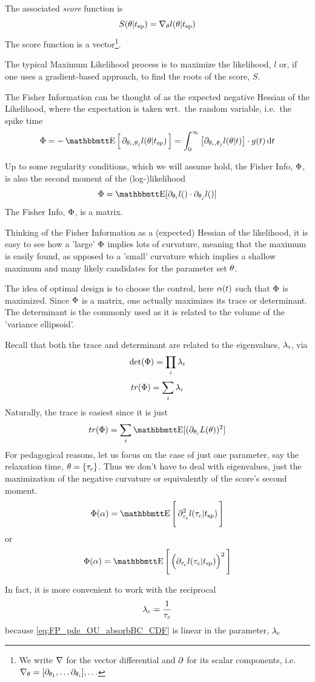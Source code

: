 \documentclass{article}
\begin{document}
The associated {\sl score} function is
$$
S({\theta} | { t_{\textrm{sp} } } ) = { \nabla }_{\theta} l({\theta} | { t_{\textrm{sp} } })
$$
The score function is a vector\footnote{We write ${ \nabla }$ for the vector
differential and ${\partial}$ for its scalar components, i.e.\ ${ \nabla }_{\theta} =
[{\partial}_{{\theta}_1},\ldots{\partial}_{{\theta}_i}],\ldots$}.

The typical Maximum Likelihood process is to 
maximize the likelihood, $l$ or, if one uses a gradient-based approach, to
find the roots of the score, $S$.

The Fisher Information can be thought of as the expected negative Hessian of the
Likelihood, where the expectation is taken wrt.\ the random variable, i.e.\ the
spike time
$$ \FI = -\Exp \Big[\,  \di_{\th_i,\th_j} l(\th | \ts) \, \Big] =
\int_0^\infty  \big[ \di_{\th_i,\th_j} l(\th | t) \big] \cdot g(t) \intd{t}
$$ 

Up to some regularity conditions, which we will assume hold, the Fisher Info,
${\Phi}$, is also the second moment of the (log-)likelihood $$ \FI = \Exp[
\di_{\th_i} l() \cdot \di_{\th_j} l()  ] $$
The Fisher Info, ${\Phi}$, is a matrix. 

Thinking of the Fisher Information as a (expected) Hessian of the likelihood,
it is easy to see how a 'large' ${\Phi}$ implies lots of curvature, meaning that the
maximum is easily found, as opposed to a 'small' curvature which implies a
shallow maximum and many likely candidates for the parameter set ${\theta}$. 

The idea of optimal design is to choose the control, here ${\alpha}(t)$ such that
${\Phi}$ is maximized. Since ${\Phi}$ is a matrix, one actually maximizes its trace or
determinant. The determinant is the commonly used as it is related to
the volume of the 'variance ellipsoid'.

Recall that both the trace and determinant are related to the eigenvalues,
${\lambda}_i$, via $$ \det({\Phi}) = \prod_i {\lambda}_i $$ $$ tr({\Phi}) = \sum_i {\lambda}_i $$
Naturally, the trace is easiest since it is just $$ tr(\FI) = \sum_i \Exp[ 
(\di_{\th_i} L(\th))^2 ]$$ 
For pedagogical reasons, let us focus on the case of just one parameter, say the
relaxation time, ${\theta} = \{{ \tau_{c} }\}$. Thus we don't have to deal with eigenvalues,
just the maximization of the negative curvature or equivalently of the score's second
moment.
$$ \FI(\a) = \Exp \Bigg[\,  \di^2_{\tc} l(\tc| \ts)  \, \Bigg]$$
or
$$ \FI(\a) = \Exp \Bigg[\, \Big( \di_{\tc} l(\tc| \ts) \Big)^2 \, \Bigg]$$

In fact, it is more convenient to work with the reciprocal $${ \lambda_{c} } = \frac 1 {{ \tau_{c} }}
$$ because \cref{eq:FP_pde_OU_absorbBC_CDF} is linear in the parameter, ${ \lambda_{c} }$
\end{document}
